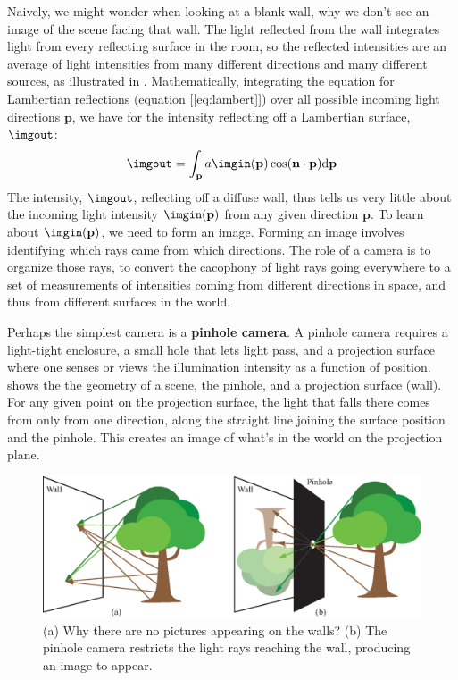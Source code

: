 Naively, we might wonder when looking at a blank wall, why we don't see an image of the scene facing that wall.  The light reflected from
the wall integrates light from every reflecting surface in the room,
so the reflected intensities are an average of light intensities from
many different directions and many
different sources, as illustrated in .  Mathematically, integrating the equation for
Lambertian reflections (equation [\ref{eq:lambert}]) over all possible
incoming light directions $\mathbf{p}$,  we have 
for the intensity reflecting off a Lambertian surface, $\imgout$:
\begin{equation}
\imgout = \int_{\mathbf{p}}  a \imgin(\mathbf{p}) \cos(\mathbf{n} \cdot \mathbf{p}) \mbox{d} \mathbf{p}
\end{equation}
The intensity, $\imgout$, reflecting off a diffuse wall, thus tells us very little about the incoming light intensity $\imgin(\mathbf{p})$ from any given direction $\mathbf{p}$. To learn about $\imgin(\mathbf{p})$, we need to form an image.
Forming an image involves identifying
which rays came from which directions. The role of a camera is to
organize those rays, to convert the cacophony of light rays going
everywhere to a set of measurements of intensities coming from
different directions in space, and thus from different surfaces in the world.


Perhaps the simplest camera is a {\bf pinhole camera}.  A pinhole camera requires a light-tight enclosure, a small hole
that lets light pass, and a projection surface where one senses or views the illumination intensity as a function of position.
 shows the the geometry of a scene, the
pinhole, and a projection surface (wall).  For any given point on the
projection surface, the light that falls there comes from only from one direction, along the straight line joining the surface position and the pinhole.   This creates an image of what's in the world on the
projection plane.%


\begin{figure}[t]
\centerline{
\includegraphics[width=1\linewidth]{figures/imaging/no_picture_on_a_wall_aina.eps}}
\caption{(a) Why there are no pictures appearing on the walls? (b) The pinhole camera restricts the light rays reaching the wall, producing an image to appear.}
\label{fig:wallpicture}
\end{figure}


